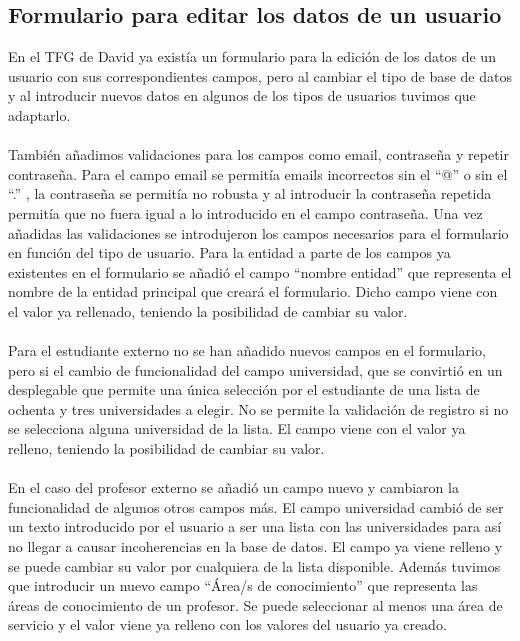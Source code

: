 \documentclass[11pt]{article}
\begin{document}
\subsection{Formulario para editar los datos de un usuario}
En el TFG de David ya existía un formulario para la edición de los datos de un usuario con sus correspondientes campos, pero al cambiar el tipo de base de datos y al introducir nuevos datos en algunos de los tipos de usuarios tuvimos que adaptarlo. \\\\
También añadimos validaciones para los campos como email, contraseña y repetir contraseña. Para el campo email se permitía emails incorrectos sin el “@” o sin el “.” , la contraseña se permitía no robusta y al introducir la contraseña repetida permitía que no fuera igual a lo introducido en el campo contraseña. Una vez añadidas las validaciones se introdujeron los campos necesarios para el formulario en función del tipo de usuario.
Para la entidad a parte de los campos ya existentes en el formulario se añadió el campo “nombre entidad” que representa el nombre de la entidad principal que creará el formulario. Dicho campo viene con el valor ya rellenado, teniendo la posibilidad de cambiar su valor.\\\\
Para el estudiante externo no se han añadido nuevos campos en el formulario, pero si el cambio de funcionalidad del campo universidad, que se convirtió en un desplegable que permite una única selección por el estudiante de una lista de ochenta y tres universidades a elegir.  No se permite la validación de registro si no se selecciona alguna universidad de la lista. El campo  viene con el valor ya relleno, teniendo la posibilidad de cambiar su valor.\\\\
En el caso del profesor externo se añadió un campo nuevo y cambiaron la funcionalidad de algunos otros campos más. El campo universidad cambió de ser un texto introducido por el usuario a ser una lista con las universidades para así no llegar a causar incoherencias en la base de datos. El campo ya viene relleno y se puede cambiar su valor por cualquiera de la lista disponible. Además tuvimos que introducir un nuevo campo “Área/s de conocimiento” que representa las áreas de conocimiento de un profesor. Se puede seleccionar al menos una área de servicio y el valor viene ya relleno con los valores del usuario ya creado.
\end{document}
